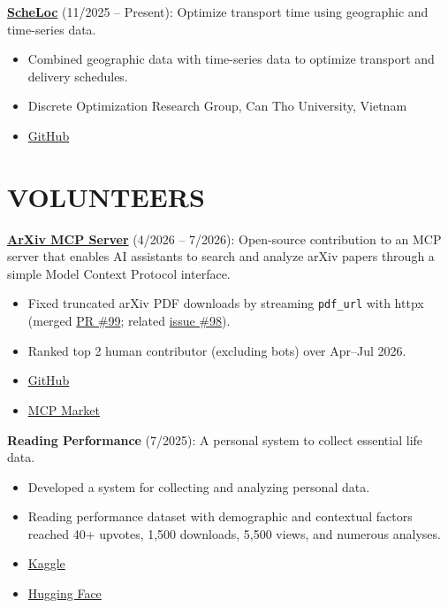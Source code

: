 \documentclass[margin]{res}
\begin{document}
\begin{resume}
  \par
  \href{https://github.com/Bancie/scheloc}{\textbf{ScheLoc}} (11/2025 -- Present): Optimize transport time using geographic and time-series data.
  \begin{itemize}
    \item Combined geographic data with time-series data to optimize transport and delivery schedules.
    \item Discrete Optimization Research Group, Can Tho University, Vietnam
    \item \href{https://github.com/Bancie/scheloc}{GitHub}
  \end{itemize}


  \section{VOLUNTEERS}
  \par
  \href{https://github.com/blazickjp/arxiv-mcp-server}{\textbf{ArXiv MCP Server}} (4/2026 -- 7/2026): Open-source contribution to an MCP server that enables AI assistants to search and analyze arXiv papers through a simple Model Context Protocol interface.
  \begin{itemize}
    \item Fixed truncated arXiv PDF downloads by streaming \texttt{pdf\_url} with httpx (merged \href{https://github.com/blazickjp/arxiv-mcp-server/pull/99}{PR \#99}; related \href{https://github.com/blazickjp/arxiv-mcp-server/issues/98}{issue \#98}).
    \item Ranked top 2 human contributor (excluding bots) over Apr--Jul 2026.
    \item \href{https://github.com/blazickjp/arxiv-mcp-server}{GitHub}
    \item \href{https://mcpmarket.com/server/arxiv-1}{MCP Market}
  \end{itemize}

  \par
  \textbf{Reading Performance} (7/2025): A personal system to collect essential life data.
  \begin{itemize}
    \item Developed a system for collecting and analyzing personal data.
    \item Reading performance dataset with demographic and contextual factors reached 40+ upvotes, 1,500 downloads, 5,500 views, and numerous analyses.
    \item \href{https://www.kaggle.com/datasets/chibangng/reading-performance}{Kaggle}
    \item \href{https://huggingface.co/datasets/Bancie/Reading-Dataset}{Hugging Face}
  \end{itemize}


\end{resume}
\end{document}
